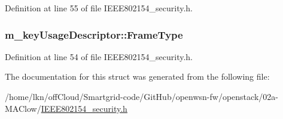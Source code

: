 Definition at line 55 of file I\+E\+E\+E802154\+\_\+security.\+h.

\subsubsection[{\texorpdfstring{Frame\+Type}{FrameType}}]{ m\+\_\+key\+Usage\+Descriptor\+::\+Frame\+Type}\hypertarget{structm__key_usage_descriptor_ac94f434b99c2a151cfa0e26bf3148213}{}\label{structm__key_usage_descriptor_ac94f434b99c2a151cfa0e26bf3148213}


Definition at line 54 of file I\+E\+E\+E802154\+\_\+security.\+h.



The documentation for this struct was generated from the following file\+:\begin{DoxyCompactItemize}
\item 
/home/lkn/off\+Cloud/\+Smartgrid-\/code/\+Git\+Hub/openwsn-\/fw/openstack/02a-\/\+M\+A\+Clow/\hyperlink{_i_e_e_e802154__security_8h}{I\+E\+E\+E802154\+\_\+security.\+h}\end{DoxyCompactItemize}
